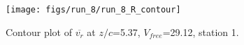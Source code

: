 \begin{figure}[H]
\centering
\texttt{[image: figs/run\_8/run\_8\_R\_contour]}
\caption{Contour plot of $\overline{v_{r}}$ at $z/c$=5.37, $V_{free}$=29.12, station 1.}
\label{fig:run_8_R_contour}
\end{figure}


